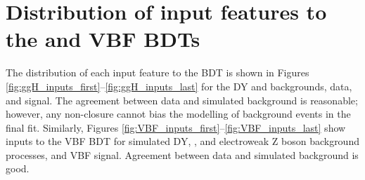\chapter{Distribution of input features to the \ggH and VBF BDTs}
\label{app:all_input_features}


The distribution of each input feature to the \ggH BDT is shown in Figures \ref{fig:ggH_inputs_first}--\ref{fig:ggH_inputs_last} for the DY and \ttbar backgrounds, data, 
and \ggH signal. The agreement between data and simulated background is reasonable; however, any non-closure cannot bias the modelling of background events in the final fit. Similarly, Figures \ref{fig:VBF_inputs_first}--\ref{fig:VBF_inputs_last} show inputs to the VBF BDT for simulated DY, \ttbar, and electroweak Z boson background processes, and VBF signal. Agreement between data and simulated background is good.

